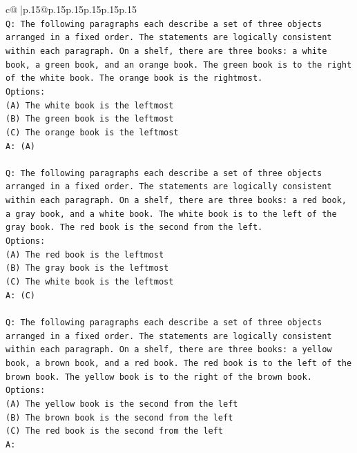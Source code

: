 \documentclass{article}
\begin{document}
{\begin{supertabular}{c@{$\;$}|p{.15\linewidth}@{}p{.15\linewidth}p{.15\linewidth}p{.15\linewidth}p{.15\linewidth}p{.15\linewidth}}
{{{\\ 
\texttt{Q: The following paragraphs each describe a set of three objects arranged in a fixed order. The statements are logically consistent within each paragraph. On a shelf, there are three books: a white book, a green book, and an orange book. The green book is to the right of the white book. The orange book is the rightmost.} \\
\texttt{Options:} \\
\texttt{(A) The white book is the leftmost} \\
\texttt{(B) The green book is the leftmost} \\
\texttt{(C) The orange book is the leftmost} \\
\texttt{A: (A)} \\
\\ 
\texttt{Q: The following paragraphs each describe a set of three objects arranged in a fixed order. The statements are logically consistent within each paragraph. On a shelf, there are three books: a red book, a gray book, and a white book. The white book is to the left of the gray book. The red book is the second from the left.} \\
\texttt{Options:} \\
\texttt{(A) The red book is the leftmost} \\
\texttt{(B) The gray book is the leftmost} \\
\texttt{(C) The white book is the leftmost} \\
\texttt{A: (C)} \\
\\ 
\texttt{Q: The following paragraphs each describe a set of three objects arranged in a fixed order. The statements are logically consistent within each paragraph. On a shelf, there are three books: a yellow book, a brown book, and a red book. The red book is to the left of the brown book. The yellow book is to the right of the brown book.} \\
\texttt{Options:} \\
\texttt{(A) The yellow book is the second from the left} \\
\texttt{(B) The brown book is the second from the left} \\
\texttt{(C) The red book is the second from the left} \\
\texttt{A:} \\
            }
        }
    }
     \\ \\


\end{supertabular}}
\end{document}
